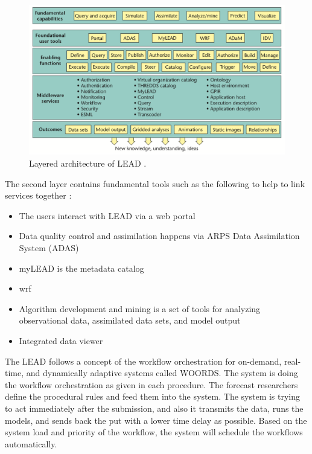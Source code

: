 \begin{figure}[htp]
    \centering
    \includegraphics[width=1.0\textwidth]{lit/lead/LEAD-system-Fundamental-capabilities-familiar-to-meteorologists-are-shown-in-the-top_W640.png}
    \caption[Layered architecture of LEAD]{Layered architecture of LEAD \cite{Droegemeier2005Service-OrientedWeather}.}
    \label{fi:lead_system}
\end{figure}

The second layer contains fundamental tools such as the following to help to link services together \cite{Droegemeier2005Service-OrientedWeather}:
\begin{itemize}
    \item The users interact with LEAD via a web portal
    \item Data quality control and assimilation happens via ARPS Data Assimilation System (ADAS)
    \item myLEAD is the metadata catalog
    \item \acrfull{wrf} \cite{MesoscaleMicroscaleMeteorologyLaboratoryWeatherModel}
    \item Algorithm development and mining is a set of tools for analyzing observational data, assimilated data sets, and model output
    \item Integrated data viewer 
\end{itemize}

The LEAD follows a concept of the workflow orchestration for on-demand, real-time, and dynamically adaptive systems called WOORDS. The system is doing the workflow orchestration as given in each procedure. The forecast researchers define the procedural rules and feed them into the system. The system is trying to act immediately after the submission, and also it transmits the data, runs the models, and sends back the put with a lower time delay as possible. Based on the system load and priority of the workflow, the system will schedule the workflows automatically.

